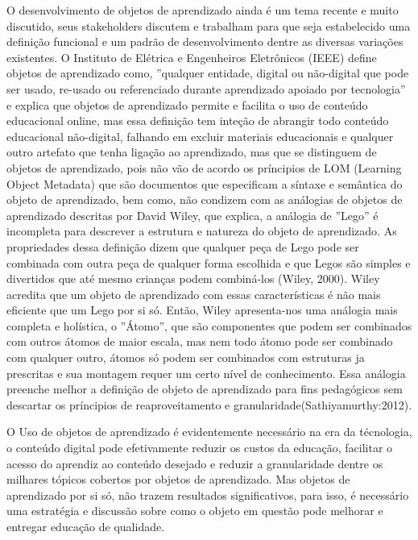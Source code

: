 \documentclass[12pt,openright,oneside,a4paper,english,french,spanish,brazil]{unifil}
\begin{document}
O desenvolvimento de objetos de aprendizado ainda é um tema recente e muito discutido, seus stakeholders  discutem e trabalham para que seja estabelecido uma definição funcional e um padrão de desenvolvimento dentre  as diversas variações existentes. O Instituto de Elétrica e Engenheiros Eletrônicos (IEEE)  define objetos de aprendizado como, ''qualquer entidade, digital ou não-digital que pode ser usado, re-usado ou referenciado durante aprendizado apoiado por tecnologia'' e explica que objetos de aprendizado permite e facilita o uso de conteúdo educacional online, mas essa definição tem inteção de abrangir todo conteúdo educacional não-digital, falhando em excluir materiais educacionais e qualquer outro artefato que tenha ligação ao aprendizado, mas que se distinguem de objetos de aprendizado, pois não vão de acordo os príncipios de LOM (Learning Object Metadata) que são documentos que especificam a síntaxe e semântica do objeto de aprendizado, bem como, não condizem com as análogias de objetos de aprendizado descritas por David Wiley, que explica, a análogia de ''Lego'' é incompleta para descrever a estrutura e natureza do objeto de aprendizado. As propriedades dessa definição dizem que qualquer peça de Lego pode ser combinada com outra peça de qualquer forma escolhida e que Legos são simples e divertidos que até mesmo crianças podem combiná-los (Wiley, 2000). Wiley acredita que um objeto de aprendizado com essas características é não mais eficiente que um Lego por si só. Então, Wiley apresenta-nos uma análogia mais completa e holística, o ''Átomo'', que são componentes que podem ser combinados com outros átomos de maior escala, mas nem todo átomo pode ser combinado com qualquer outro, átomos só podem ser combinados com estruturas ja prescritas e sua montagem requer um certo nível de conhecimento. Essa análogia preenche melhor a definição de objeto de aprendizado para fins pedagógicos sem descartar os príncipios de reaproveitamento e granularidade(Sathiyamurthy:2012).

O Uso de objetos de aprendizado é evidentemente necessário na era da técnologia, o conteúdo digital pode efetivamente reduzir os custos da educação, facilitar o acesso do aprendiz ao conteúdo desejado e reduzir a granularidade dentre os milhares tópicos cobertos por objetos de aprendizado.
Mas objetos de aprendizado por si só, não trazem resultados significativos, para isso, é necessário uma estratégia e discussão sobre como o objeto em questão pode melhorar e entregar educação de qualidade.
\end{document}
